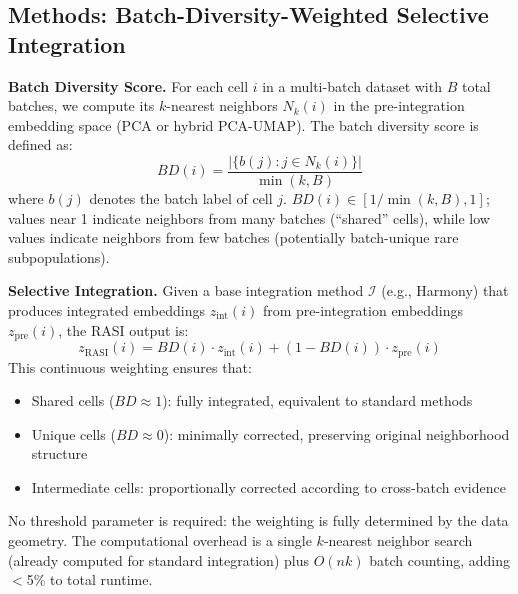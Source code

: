 

\subsection*{Methods: Batch-Diversity-Weighted Selective Integration}

\textbf{Batch Diversity Score.}
For each cell $i$ in a multi-batch dataset with $B$ total batches, we compute its $k$-nearest neighbors $N_k(i)$ in the pre-integration embedding space (PCA or hybrid PCA-UMAP). The batch diversity score is defined as:
\begin{equation}
BD(i) = \frac{|\{b(j) : j \in N_k(i)\}|}{\min(k, B)}
\end{equation}
where $b(j)$ denotes the batch label of cell $j$. $BD(i) \in [1/\min(k,B), 1]$; values near 1 indicate neighbors from many batches (``shared'' cells), while low values indicate neighbors from few batches (potentially batch-unique rare subpopulations).

\textbf{Selective Integration.}
Given a base integration method $\mathcal{I}$ (e.g., Harmony) that produces integrated embeddings $z_{\text{int}}(i)$ from pre-integration embeddings $z_{\text{pre}}(i)$, the RASI output is:
\begin{equation}
z_{\text{RASI}}(i) = BD(i) \cdot z_{\text{int}}(i) + (1 - BD(i)) \cdot z_{\text{pre}}(i)
\end{equation}
This continuous weighting ensures that:
\begin{itemize}
\item Shared cells ($BD \approx 1$): fully integrated, equivalent to standard methods
\item Unique cells ($BD \approx 0$): minimally corrected, preserving original neighborhood structure
\item Intermediate cells: proportionally corrected according to cross-batch evidence
\end{itemize}

No threshold parameter is required: the weighting is fully determined by the data geometry. The computational overhead is a single $k$-nearest neighbor search (already computed for standard integration) plus $O(nk)$ batch counting, adding $<$5\% to total runtime.


